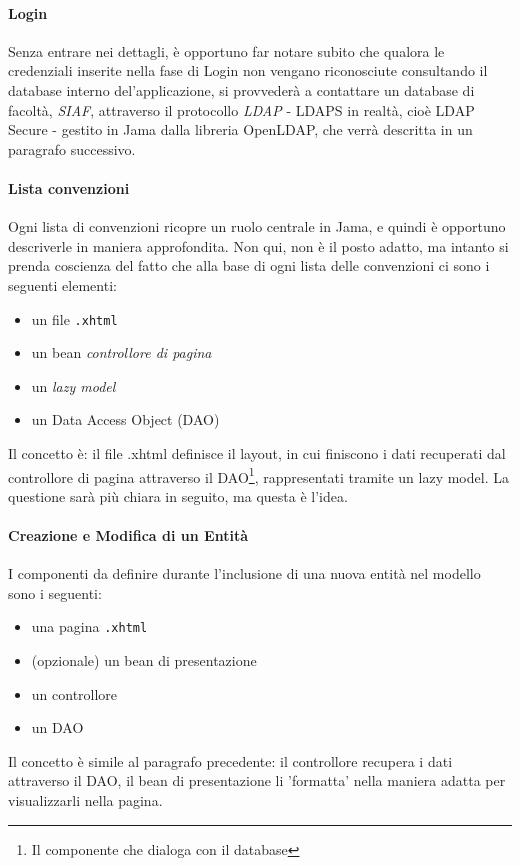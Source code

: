 \paragraph{Login}
Senza entrare nei dettagli, è opportuno far notare subito che qualora le credenziali inserite nella fase di Login non vengano riconosciute consultando il database interno del'applicazione, si provvederà a contattare un database di facoltà, \textsl{SIAF}, attraverso il protocollo \textsl{LDAP} - LDAPS in realtà, cioè LDAP Secure - gestito in Jama dalla libreria OpenLDAP, che verrà descritta in un paragrafo successivo.
\paragraph{Lista convenzioni}
Ogni lista di convenzioni ricopre un ruolo centrale in Jama, e quindi è opportuno descriverle in maniera approfondita. Non qui, non è il posto adatto, ma intanto si prenda coscienza del fatto che alla base di ogni lista delle convenzioni ci sono i seguenti elementi:
\begin{itemize}
\item un file \texttt{.xhtml}
\item un bean \textsl{controllore di pagina}
\item un \textit{lazy model}
\item un Data Access Object (DAO)\newline
\end{itemize}
Il concetto è: il file .xhtml definisce il layout, in cui finiscono i dati recuperati dal controllore di pagina attraverso il DAO\footnote{Il componente che dialoga con il database}, rappresentati tramite un lazy model. La questione sarà più chiara in seguito, ma questa è l'idea.
\paragraph{Creazione e Modifica di un Entità}
I componenti da definire durante l'inclusione di una nuova entità nel modello sono i seguenti:
\begin{itemize}
\item una pagina \texttt{.xhtml}
\item (opzionale) un bean di presentazione
\item un controllore
\item un DAO\newline
\end{itemize}
Il concetto è simile al paragrafo precedente: il controllore recupera i dati attraverso il DAO, il bean di presentazione li 'formatta' nella maniera adatta per visualizzarli nella pagina.
